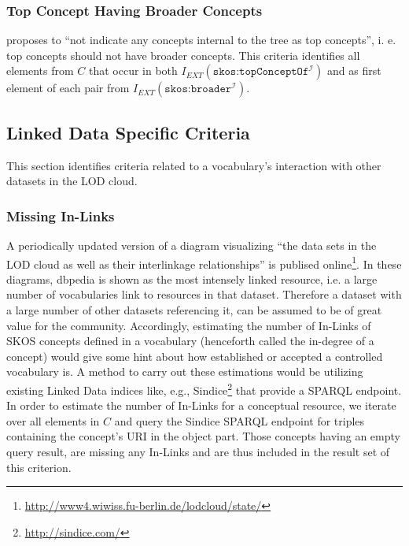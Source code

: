 \subsubsection{Top Concept Having Broader Concepts}
\cite{Allemang2011} proposes to ``not indicate any concepts internal to the tree as top concepts'', i. e. top concepts should not have broader concepts. This criteria identifies all elements from $C$ that occur in both $I_{EXT}(\texttt{skos:topConceptOf}^\mathcal{I})$ and as first element of each pair from $I_{EXT}(\texttt{skos:broader}^\mathcal{I})$.


\subsection{Linked Data Specific Criteria}

This section identifies criteria related to a vocabulary's interaction with other datasets in the LOD cloud.

\subsubsection{Missing In-Links}
A periodically updated version of a diagram visualizing ``the data sets in the LOD cloud as well as their interlinkage relationships'' is publised online\footnote{\url{http://www4.wiwiss.fu-berlin.de/lodcloud/state/}}. In these diagrams, dbpedia is shown as the most intensely linked resource, i.e. a large number of vocabularies link to resources in that dataset. Therefore a dataset with a large number of other datasets referencing it, can be assumed to be of great value for the community. Accordingly, estimating the number of In-Links of SKOS concepts defined in a vocabulary (henceforth called the in-degree of a concept) would give some hint about how established or accepted a controlled vocabulary is. A method to carry out these estimations would be utilizing existing Linked Data indices like, e.g., Sindice\footnote{\url{http://sindice.com/}} that provide a SPARQL endpoint. In order to estimate the number of In-Links for a conceptual resource, we iterate over all elements in $C$ and query the Sindice SPARQL endpoint for triples containing the concept's URI in the object part. Those concepts having an empty query result, are missing any In-Links and are thus included in the result set of this criterion.

